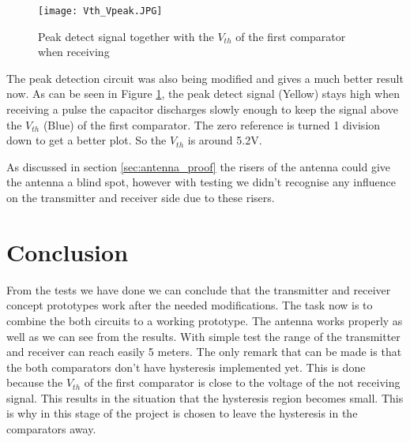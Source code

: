 \begin{figure}[H]
\centering
\texttt{[image: Vth\_Vpeak.JPG]}
\caption{Peak detect signal together with the $V_{th}$ of the first comparator when receiving}\label{fig:peakvth}
\end{figure}

The peak detection circuit was also being modified and gives a much better result now. As can be seen in Figure \ref{fig:peakvth}, the peak detect signal (Yellow) stays high when receiving a pulse the capacitor discharges slowly enough to keep the signal above the $V_{th}$ (Blue) of the first comparator. The zero reference is turned 1 division down to get a better plot. So the $V_{th}$ is around 5.2V.

As discussed in section \ref{sec:antenna_proof} the risers of the antenna could give the antenna a blind spot, however with testing we didn't recognise any influence on the transmitter and receiver side due to these risers.

\section{Conclusion}
From the tests we have done we can conclude that the transmitter and receiver concept prototypes work after the needed modifications. The task now is to combine the both circuits to a working prototype.
The antenna works properly as well as we can see from the results. With simple test the range of the transmitter and receiver can reach easily 5 meters.
The only remark that can be made is that the both comparators don't have hysteresis implemented yet. This is done because the $V_{th}$ of the first comparator is close to the voltage of the not receiving signal. This results in the situation that the hysteresis region becomes small. This is why in this stage of the project is chosen to leave the hysteresis in the comparators away.
